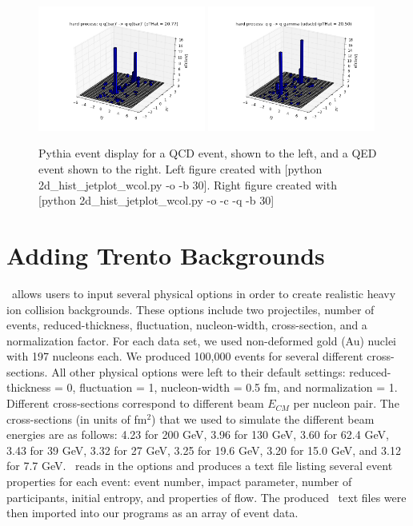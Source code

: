 \documentclass[11pt]{article}
\begin{document}
\begin{figure}[h]
\begin{center}
\includegraphics[width=0.49\textwidth]{2d_hist_jetplot.png}
\includegraphics[width=0.49\textwidth]{2d_hist_jetplot2.png}
\label{fig_label}
\caption{Pythia event display for a QCD event, shown to the left, and a QED event shown to the right.  Left figure created with [python 2d\_hist\_jetplot\_wcol.py -o -b 30]. Right figure created with [python 2d\_hist\_jetplot\_wcol.py -o -c -q -b 30]}
\end{center}
\end{figure}

\section{Adding Trento Backgrounds}
%
%
\trento\ allows users to input several physical options in order to create realistic heavy ion collision backgrounds. These options include two projectiles, number of events, reduced-thickness, fluctuation, nucleon-width, cross-section, and a normalization factor. For each data set,  we used non-deformed gold (Au) nuclei with 197 nucleons each. We produced 100,000 events for several different cross-sections. All other physical options were left to their default settings: reduced-thickness = 0, fluctuation = 1, nucleon-width = 0.5 fm, and normalization = 1. Different cross-sections correspond to different beam $E_{CM}$ per nucleon pair. The cross-sections (in units of fm$^2$) that we used to simulate the different beam energies are as follows: 4.23 for 200 GeV, 3.96 for 130 GeV, 3.60 for 62.4 GeV, 3.43 for 39 GeV, 3.32 for 27 GeV, 3.25 for 19.6 GeV, 3.20 for 15.0 GeV, and 3.12 for 7.7 GeV. \trento\ reads in the options and produces a text file listing several event properties for each event: event number, impact parameter, number of participants, initial entropy, and properties of flow. The produced \trento\ text files were then imported into our programs as an array of event data.
\end{document}
